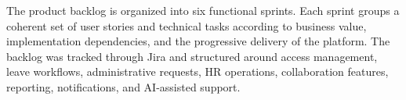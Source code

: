 \vspace{0.15cm}

{\fontsize{11}{15}\selectfont
\setlength{\parindent}{1.2cm}
\setlength{\parskip}{6pt}

\indent The product backlog is organized into six functional sprints. Each sprint groups a coherent set of user stories and technical tasks according to business value, implementation dependencies, and the progressive delivery of the platform. The backlog was tracked through Jira and structured around access management, leave workflows, administrative requests, HR operations, collaboration features, reporting, notifications, and AI-assisted support.

}

\vspace{0.15cm}

\small
\renewcommand{\arraystretch}{1.18}
\setlength{\tabcolsep}{3.2pt}
\setlength{\LTleft}{-0.6cm}
